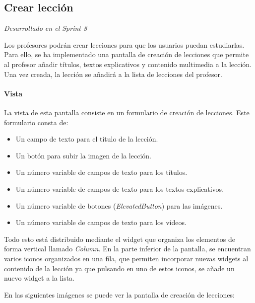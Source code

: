 \subsection{Crear lección} 

\textit{Desarrollado en el Sprint 8}

Los profesores podrán crear lecciones para que los usuarios puedan estudiarlas. Para ello, se ha implementado una pantalla de creación de lecciones que permite al profesor añadir títulos, textos explicativos y contenido multimedia a la lección. Una vez creada, la lección se añadirá a la lista de lecciones del profesor.


\paragraph*{Vista}
La vista de esta pantalla consiste en un formulario de creación de lecciones. Este formulario consta de:
\begin{itemize}
  \item Un campo de texto para el título de la lección.
  \item Un botón para subir la imagen de la lección.
  \item Un número variable de campos de texto para los títulos.
  \item Un número variable de campos de texto para los textos explicativos.
  \item Un número variable de botones (\textit{ElevatedButton}) para las imágenes.
  \item Un número variable de campos de texto para los vídeos.
\end{itemize}

\newpage

Todo esto está distribuido mediante el widget que organiza los elementos de forma vertical llamado \textit{Column}. 
En la parte inferior de la pantalla, se encuentran varios iconos organizados en una fila, que permiten incorporar nuevas widgets al contenido de la lección
ya que pulsando en uno de estos iconos, se añade un nuevo widget a la lista.

En las siguientes imágenes se puede ver la pantalla de creación de lecciones:

